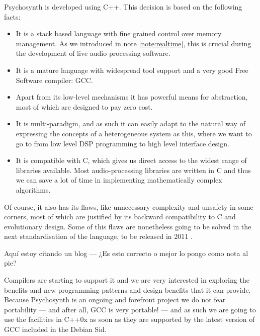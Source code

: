 Psychosynth is developed using C++. This decision is based on the
following facts:

\begin{itemize}
\item It is a stack based language with fine grained control over
  memory management. As we introduced in note \ref{note:realtime},
  this is crucial during the development of live audio processing
  software.

\item It is a mature language with widespread tool support and a very
  good Free Software compiler: GCC.

\item Apart from its low-level mechanisms it has powerful means for
  abstraction, most of which are designed to pay zero cost.

\item It is multi-paradigm, and as such it can easily adapt to the
  natural way of expressing the concepts of a heterogeneous system as
  this, where we want to go to from low level DSP programming to high
  level interface design.

\item It is compatible with C, which gives us direct access to the
  widest range of libraries available. Most audio-processing libraries
  are written in C and thus we can save a lot of time in
  implementing mathematically complex algorithms. 
\end{itemize}

Of course, it also has its flaws, like unnecessary complexity and
unsafety in some corners, most of which are justified by its backward
compatibility to C and evolutionary design. Some of this flaws are
nonetheless going to be solved in the next standardisation of the
language, to be released in 2011 \cite{herb10iso}.

\begin{todo}
Aquí estoy citando un blog --- ¿Es esto correcto o mejor lo pongo como
nota al pie? 
\end{todo}

Compilers are starting to support it and we are very interested in
exploring the benefits and new programming patterns and design
benefits that it can provide. Because Psychosynth is an ongoing and
forefront project we do not fear portability --- and after all, GCC is
very portable! --- and as such we are going to use the facilities in
C++0x as soon as they are supported by the latest version of GCC
included in the Debian Sid.

